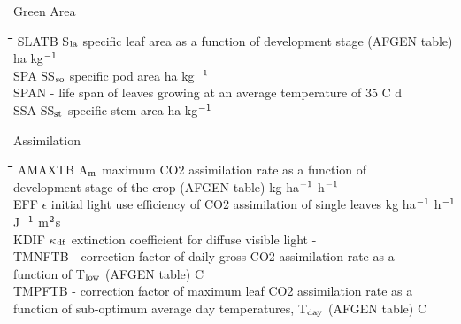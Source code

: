 \documentclass[11pt]{article}
\begin{document}
\bigskip
Green Area\nwln
\begin{tabbing}
\hspace{1.27cm}\=\hspace{1.27cm}\=\hspace{1.27cm}\=\hspace{1.27cm}\=%
\hspace{1.27cm}\=\hspace{1.27cm}\=\hspace{1.27cm}\=\hspace{1.27cm}\=%
\hspace{1.27cm}\=\hspace{1.27cm}\=\kill
SLATB\> \> S$_{{\rm la}}$\> specific leaf area as a function of development stage (AFGEN table)\> \> \> \> \> \> \> ha kg$^{{\rm -1}}$\\
SPA\> \> SS$_{{\rm so}}$\> specific pod area\> \> \> \> \> \> \> ha kg$^{{\rm -1}}$\\
SPAN\> \> -\> life span of leaves growing at an average temperature of 35 \degrees C\> \> \> \> \> \> \> d\\
SSA\> \> SS$_{{\rm st}}$\> specific stem area\> \> \> \> \> \> \> ha kg$^{{\rm -1}}$
\end{tabbing}

\bigskip
Assimilation\nwln
\begin{tabbing}
\hspace{1.27cm}\=\hspace{1.27cm}\=\hspace{1.27cm}\=\hspace{1.27cm}\=%
\hspace{1.27cm}\=\hspace{1.27cm}\=\hspace{1.27cm}\=\hspace{1.27cm}\=%
\hspace{1.27cm}\=\hspace{1.27cm}\=\kill
AMAXTB\> \> A$_{{\rm m}}$\> maximum CO2 assimilation rate as a function of\\
\>\> \> development stage of the crop (AFGEN table)\> \> \> \> \> \> \> kg ha$^{{\rm -1}}$ h$^{{\rm -1}}$\\
EFF\> \> $\epsilon$\> initial light use efficiency of CO2 assimilation of single leaves \> \> \> \> \> \> \> kg ha$^{{\rm -1}}$ h$^{{\rm -1}}$ J$^{{\rm -1}}$ m$^{{\rm 2}}$s\\
KDIF\> \> $\kappa$$_{{\rm df}}$\> extinction coefficient for diffuse visible light\> \> \> \> \> \> \> -\\
TMNFTB\> \> -\> correction factor of daily gross CO2 assimila\-tion rate as a\\
\>\> \> function of T$_{{\rm low}}$ (AFGEN table)\> \> \> \> \> \> \> \degrees C\\
TMPFTB\> \> -\> correction factor of maximum leaf CO2 assimila\-tion rate as a\\
\>\> \> function of sub-optimum average day temperatu\-res, T$_{{\rm day}}$ (AFGEN table)\> \> \> \> \> \> \> \degrees C
\end{tabbing}
\end{document}
